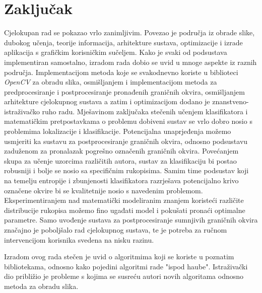 \documentclass[times, utf8, diplomski]{fer}
\theoremstyle{definition}
\begin{document}
\chapter{Zaključak}
Cjelokupan rad se pokazao vrlo zanimljivim. Povezao je područja iz obrade slike, dubokog učenja, teorije informacija, arhitekture sustava, optimizacije i izrade aplikacija s grafičkim korisničkim sučeljem. Kako je svaki od podsustava implementiran samostalno, izradom rada dobio se uvid u mnoge aspekte iz raznih područja. Implementacijom metoda koje se svakodnevno koriste u biblioteci \textit{OpenCV} za obradu slika, osmišljanjem i implementacijom metoda za predprocesiranje i postprocesiranje pronađenih graničnih okvira, osmišljanjem arhitekture cjelokupnog sustava a zatim i optimizacijom dodano je znanstveno-istraživačko ruho radu. Mješavinom zaključaka stečenih učenjem klasifikatora i matematičkim pretpostavkama o problemu dobiveni sustav se vrlo dobro nosio s problemima lokalizacije i klasifikacije.
Potencijalna unaprjeđenja možemo usmjeriti ka sustavu za postprocesiranje graničnih okvira, odnosno podsustavu zaduženom za pronalazak pogrešno označenih graničnih okvira.  Povećanjem skupa za učenje uzorcima različitih autora, sustav za klasifikaciju bi postao robusniji i bolje se nosio sa specifičnim rukopisima. Samim time podsustav koji na temelju entropije i zbunjenosti klasifikatora razrješava potencijalno krivo označene okvire  bi se kvalitetnije nosio s navedenim problemom. Eksperimentiranjem nad matematički modeliranim znanjem koristeći različite distribucije rukopisa  možemo fino ugađati model i pokušati pronaći optimalne parametre.  Samo uvođenje sustava za postprocesiranje sumnjivih graničnih okvira  značajno je poboljšalo rad cjelokupnog sustava, te je potreba za ručnom intervencijom korisnika svedena na nisku razinu. 

Izradom ovog rada stečen je uvid  o algoritmima koji se koriste u poznatim bibliotekama, odnosno kako pojedini algoritmi rade "ispod haube". Istraživački dio približio je probleme s kojima se susreću autori novih algoritama odnosno metoda za obradu slika.
\nocite{*}



\end{document}

